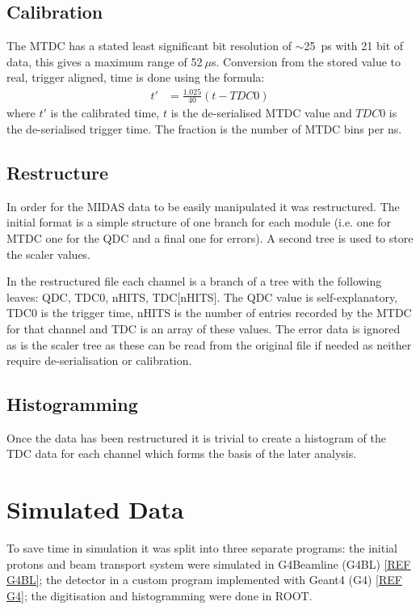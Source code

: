 \documentclass[]{article}
\newcommand{\ms}{$~\mu$s}
\begin{document}
\subsection{Calibration} %
\label{sub:calibration}
The MTDC has a stated least significant bit resolution of $\sim$25~ps with 21 bit of data, this gives a maximum range of 52\ms{}. Conversion from the stored value to real, trigger aligned, time is done using the formula:
\begin{align}\label{equ:tdc_calibration}
	t'   &= \frac{1.025}{40}(t - TDC0)
\end{align}
where $t'$ is the calibrated time, $t$ is the de-serialised MTDC value and $TDC0$ is the de-serialised trigger time. The fraction is the number of MTDC bins per ns.
\subsection{Restructure} %
\label{sub:restructure}
In order for the MIDAS data to be easily manipulated it was restructured. The initial format is a simple structure of one branch for each module (i.e. one for MTDC one for the QDC and a final one for errors). A second tree is used to store the scaler values. 

In the restructured file each channel is a branch of a tree with the following leaves: QDC, TDC0, nHITS, TDC[nHITS]. The QDC value is self-explanatory, TDC0 is the trigger time, nHITS is the number of entries recorded by the MTDC for that channel and TDC is an array of these values. The error data is ignored as is the scaler tree as these can be read from the original file if needed as neither require de-serialisation or calibration.
\subsection{Histogramming} %
\label{sub:Histogramming}
Once the data has been restructured it is trivial to create a histogram of the TDC data for each channel which forms the basis of the later analysis.
\section{Simulated Data} %
\label{sec:simulated_data}
To save time in simulation it was split into three separate programs: the initial protons and beam transport system were simulated in G4Beamline (G4BL) \ref{REF G4BL}; the detector in a custom program implemented with Geant4 (G4) \ref{REF G4}; the digitisation and histogramming were done in ROOT.
\end{document}
